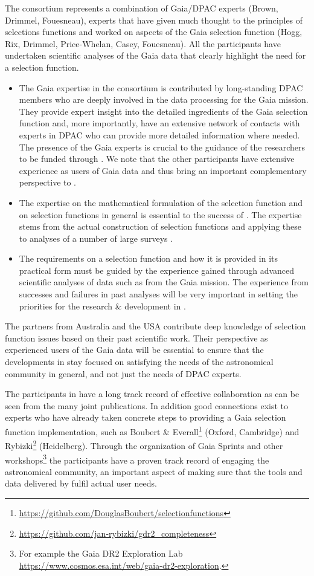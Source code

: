 The consortium represents a combination of Gaia/DPAC experts (Brown, Drimmel, Fouesneau), experts that have given much thought to the principles of selections functions and worked on aspects of the Gaia selection function (Hogg, Rix, Drimmel, Price-Whelan, Casey, Fouesneau). All the participants have undertaken scientific analyses of the Gaia data that clearly highlight the need for a selection function. 
\begin{itemize}
    \item The Gaia expertise in the consortium is contributed by long-standing DPAC members who are deeply involved in the data processing for the Gaia mission. They provide expert insight into the detailed ingredients of the Gaia selection function and, more importantly, have an extensive network of contacts with experts in DPAC who can provide more detailed information where needed. The presence of the Gaia experts is crucial to the guidance of the researchers to be funded through {\acro}. We note that the other participants have extensive experience as users of Gaia data and thus bring an important complementary perspective to {\acro}.
    \item The expertise on the mathematical formulation of the selection function and on selection functions in general is essential to the success of {\acro}. The expertise stems from the actual construction of selection functions and applying these to analyses of a number of large surveys .
    \item The requirements on a selection function and how it is provided in its practical form must be guided by the experience gained through advanced scientific analyses of data such as from the Gaia mission. The experience from successes and failures in past analyses will be very important in setting the priorities for the research \& development in {\acro}.
\end{itemize}

The partners from Australia and the USA contribute deep knowledge of selection function issues based on their past scientific work. Their perspective as experienced users of the Gaia data will be essential to ensure that the developments in {\acro} stay focused on satisfying the needs of the astronomical community in general, and not just the needs of DPAC experts.

The participants in {\acro} have a long track record of effective collaboration as can be seen from the many joint publications. In addition good connections exist to experts who have already taken concrete steps to providing a Gaia selection function implementation, such as Boubert \& Everall\footnote{\url{https://github.com/DouglasBoubert/selectionfunctions}} (Oxford, Cambridge) and Rybizki\footnote{\url{https://github.com/jan-rybizki/gdr2_completeness}} (Heidelberg). Through the organization of Gaia Sprints and other workshops\footnote{For example the Gaia DR2 Exploration Lab \url{https://www.cosmos.esa.int/web/gaia-dr2-exploration}.} the participants have a proven track record of engaging the astronomical community, an important aspect of making sure that the tools and data delivered by {\acro} fulfil actual user needs.

